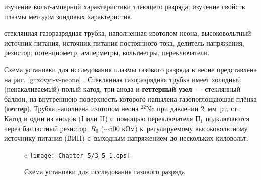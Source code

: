 




\begin{lab:aim}
изучение вольт-амперной характеристики тлеющего разряда; изучение свойств плазмы методом зондовых характеристик.
\end{lab:aim}

\begin{lab:equipment}
стеклянная газоразрядная трубка, наполненная изотопом неона, высоковольтный источник питания, источник питания
постоянного тока, делитель напряжения, резистор, потенциометр, амперметры, вольтметры, переключатели. 
\end{lab:equipment}

Схема установки для исследования плазмы газового разряда в неоне представлена на рис. \ref{gazovyj-v-neone}%
. Стеклянная газоразрядная
трубка имеет холодный (ненакаливаемый) полый катод, три анода и \textbf{геттерный узел}~--- стеклянный баллон, на
внутреннюю поверхность которого напылена газопоглощающая плёнка (\textbf{геттер}). Трубка наполнена изотопом неона 
$^{22}$Ne при давлении 2~мм~рт. ст. Катод и один из анодов (I или II) с~помощью переключателя П$_1$ подключаются через
балластный резистор~$R_{б}$ ($\sim500$ кОм) к~регулируемому высоковольтному источнику питания (ВИП) с~выходным
напряжением до нескольких киловольт.

\begin{figure}{c}
	\texttt{[image: Chapter\_5/3\_5\_1.eps]}
	\caption{Схема установки для исследования газового разряда}
\end{figure}

